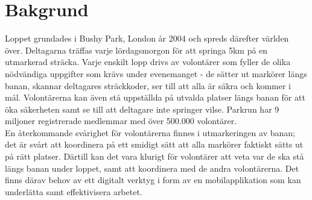 \section{Bakgrund}






Loppet grundades i Bushy Park, London år 2004 och spreds därefter världen över. Deltagarna träffas varje lördagsmorgon för att springa 5km på en utmarkerad sträcka. Varje enskilt lopp drivs av volontärer som fyller de olika nödvändiga uppgifter som krävs under evenemanget - de sätter ut markörer längs banan, skannar deltagares sträckkoder, ser till att alla är säkra och kommer i mål. Volontärerna kan även stå uppställda på utvalda platser längs banan för att öka säkerheten samt se till att deltagare inte springer vilse. Parkrun har 9 miljoner registrerade medlemmar med över 500.000 volontärer\cite{omOss}. \\
En återkommande svårighet för volontärerna finnes i utmarkeringen av banan; det är svårt att koordinera på ett smidigt sätt att alla markörer faktiskt sätts ut på rätt platser. Därtill kan det vara klurigt för volontärer att veta var de ska stå längs banan under loppet, samt att koordinera med de andra volontärerna. Det finns därav behov av ett digitalt verktyg i form av en mobilapplikation som kan underlätta samt effektivisera arbetet.\\

